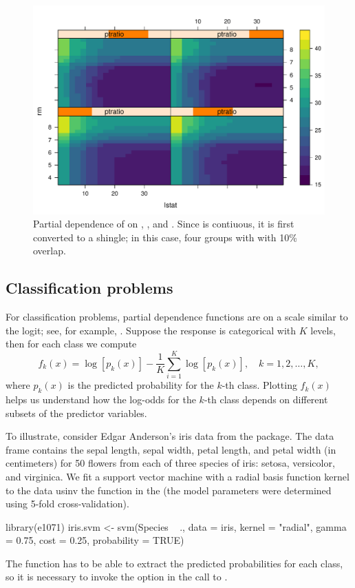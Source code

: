 \begin{figure}[htbp]
  \centering
  \includegraphics[width=0.8\linewidth]{partial_par}
  \caption{Partial dependence of  on , , and . Since  is contiuous, it is first converted to a shingle; in this case, four groups with with 10\% overlap.}
  \label{fig:partial_par}
\end{figure}

\subsection{Classification problems}

For classification problems, partial dependence functions are on a scale similar to the logit; see, for example, \citet[pp. 369--370]{hastie-elements-2009}. Suppose the response is categorical with $K$ levels, then for each class we compute
\begin{equation}
\label{eqn:avg-logit}
f_k(x) = \log\left[p_k(x)\right] - \frac{1}{K}\sum_{i = 1}^K\log\left[p_k(x)\right], \quad k = 1, 2, \dots, K,
\end{equation}
where $p_k(x)$ is the predicted probability for the $k$-th class. Plotting $f_k(x)$ helps us understand how the log-odds for the $k$-th class depends on different subsets of the predictor variables.

To illustrate, consider Edgar Anderson's iris data from the  package. The  data frame contains the sepal length, sepal width, petal length, and petal width (in centimeters) for 50 flowers from each of three species of iris:  setosa, versicolor, and virginica. We fit a support vector machine with a radial basis function kernel to the data usinv the  function in the  (the model parameters were determined using 5-fold cross-validation).
\begin{example}
library(e1071)
iris.svm <- svm(Species ~ ., data = iris, kernel = "radial", gamma = 0.75,
                cost = 0.25, probability = TRUE)
\end{example}
The  function has to be able to extract the predicted probabilities for each class, so it is necessary to invoke the  option in the call to .

